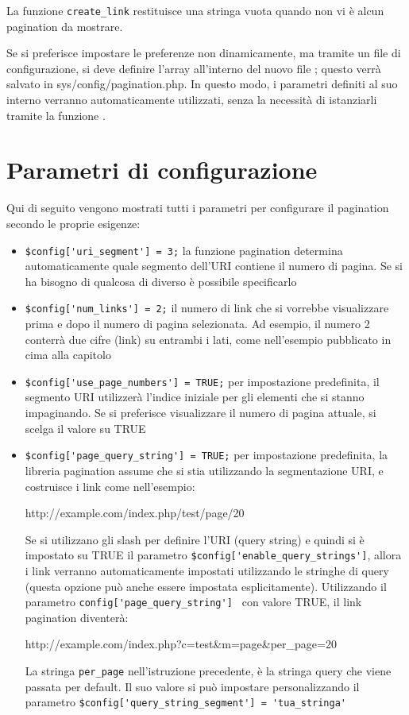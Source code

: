 La funzione \verb|create_link| restituisce una stringa vuota quando non vi è alcun pagination da mostrare.

Se si preferisce impostare le preferenze non dinamicamente, ma tramite un file di configurazione, si deve definire l'array  all'interno del nuovo file ; questo verrà salvato in sys{/config/pagination.php}. In questo modo, i parametri definiti al suo interno verranno automaticamente utilizzati, senza la necessità di istanziarli tramite la funzione .

\section*{Parametri di configurazione}
Qui di seguito vengono mostrati tutti i parametri per configurare il pagination secondo le proprie esigenze:

\begin{itemize}
\item \verb|$config['uri_segment'] = 3;| la funzione pagination determina automaticamente quale segmento dell'URI contiene il numero di pagina. Se si ha bisogno di qualcosa di diverso è possibile specificarlo
\item \verb|$config['num_links'] = 2;| il numero di link che si vorrebbe visualizzare prima e dopo il numero di pagina selezionata. Ad esempio, il numero 2 conterrà due cifre (link) su entrambi i lati, come nell'esempio pubblicato in cima alla capitolo
\item \verb|$config['use_page_numbers'] = TRUE;| per impostazione predefinita, il segmento URI utilizzerà l'indice iniziale per gli elementi che si stanno impaginando. Se si preferisce visualizzare il numero di pagina attuale, si scelga il valore su TRUE
\item \verb|$config['page_query_string'] = TRUE;| per impostazione predefinita, la libreria pagination assume che si stia utilizzando la segmentazione URI, e costruisce i link come nell'esempio:

\begin{code}
http://example.com/index.php/test/page/20
\end{code}

Se si utilizzano gli slash per definire l'URI (query string) e quindi si è impostato su TRUE il parametro \verb|$config['enable_query_strings']|, allora i  link verranno automaticamente impostati utilizzando le stringhe di query (questa opzione può anche essere impostata esplicitamente). Utilizzando il parametro \verb|config['page_query_string'] | con valore TRUE, il link pagination diventerà:

\begin{code}
http://example.com/index.php?c=test&m=page&per_page=20
\end{code}

La stringa \verb|per_page| nell'istruzione precedente, è la stringa query che viene passata per default. Il suo valore si può impostare personalizzando il parametro \verb|$config['query_string_segment'] = 'tua_stringa'|
\end{itemize}

